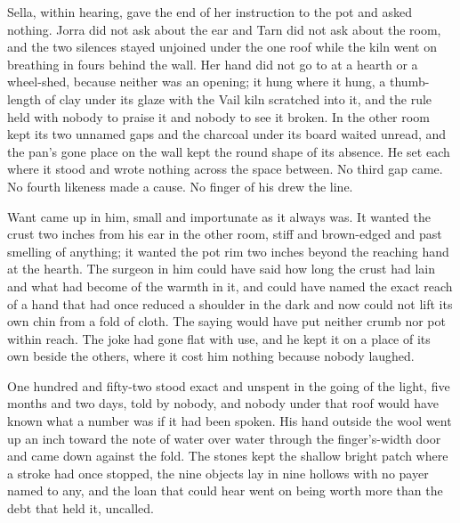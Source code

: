 Sella, within hearing, gave the end of her instruction to the pot and asked nothing. Jorra did not ask about the ear and Tarn did not ask about the room, and the two silences stayed unjoined under the one roof while the kiln went on breathing in fours behind the wall. Her hand did not go to  at a hearth or a wheel-shed, because neither was an opening; it hung where it hung, a thumb-length of  clay under its glaze with the Vail kiln scratched into it, and the rule held with nobody to praise it and nobody to see it broken. In the other room  kept its two unnamed gaps and the charcoal under its board waited unread, and the pan's gone place on the wall kept the round shape of its absence. He set each where it stood and wrote nothing across the space between. No third gap came. No fourth likeness made a cause. No finger of his drew the line.

Want came up in him, small and importunate as it always was. It wanted the crust two inches from his ear in the other room, stiff and brown-edged and past smelling of anything; it wanted the pot rim two inches beyond the reaching hand at the hearth. The surgeon in him could have said how long the crust had lain and what had become of the warmth in it, and could have named the exact reach of a hand that had once reduced a shoulder in the dark and now could not lift its own chin from a fold of cloth. The saying would have put neither crumb nor pot within reach. The joke had gone flat with use, and he kept it on a place of its own beside the others, where it cost him nothing because nobody laughed.

One hundred and fifty-two stood exact and unspent in the going of the light, five months and two days, told by nobody, and nobody under that roof would have known what a number was if it had been spoken. His hand outside the wool went up an inch toward the note of water over water through the finger's-width door and came down against the fold. The stones kept the shallow bright patch where a stroke had once stopped, the nine objects lay in nine hollows with no payer named to any, and the loan that could hear went on being worth more than the debt that held it, uncalled.
